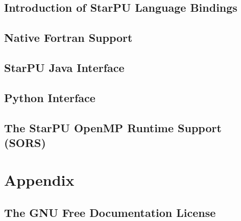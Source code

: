 %
%
%
%
%
\newcommand\starputitle{StarPU Handbook - StarPU Language Bindings}
\setcounter{tocdepth}{2}


\chapter{Introduction of StarPU Language Bindings}
\label{index}
\hypertarget{index}{}


\chapter{Native Fortran Support}
\label{NativeFortranSupport}
\hypertarget{NativeFortranSupport}{}


\chapter{StarPU Java Interface}
\label{StarPUJavaInterface}
\hypertarget{StarPUJavaInterface}{}


\chapter{Python Interface}
\label{PythonInterface}
\hypertarget{PythonInterface}{}


\chapter{The StarPU OpenMP Runtime Support (SORS)}
\label{OpenMPRuntimeSupport}
\hypertarget{OpenMPRuntimeSupport}{}


\part{Appendix}

\chapter{The GNU Free Documentation License}
\label{GNUFreeDocumentationLicense}
\hypertarget{GNUFreeDocumentationLicense}{}




